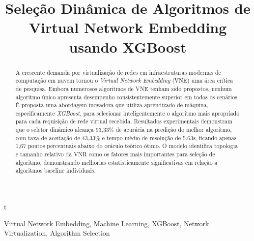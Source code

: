 \documentclass[conference]{IEEEtran}
\begin{document}
t
\title{Seleção Dinâmica de Algoritmos de Virtual Network Embedding usando XGBoost}

\author{
\and
{}
}

\maketitle

\begin{abstract}
A crescente demanda por virtualização de redes em infraestruturas modernas de computação em nuvem tornou o \textit{Virtual Network Embedding} (VNE) uma área crítica de pesquisa. Embora numerosos algoritmos de VNE tenham sido propostos, nenhum algoritmo único apresenta desempenho consistentemente superior em todos os cenários. É proposta uma abordagem inovadora que utiliza aprendizado de máquina, especificamente \textit{XGBoost}, para selecionar inteligentemente o algoritmo mais apropriado para cada requisição de rede virtual recebida. Resultados experimentais demonstram que o seletor dinâmico alcança 93,33\% de acurácia na predição do melhor algoritmo, com taxa de aceitação de 43,33\% e tempo médio de resolução de 5,63s, ficando apenas 1,67 pontos percentuais abaixo do oráculo teórico ótimo. O modelo identifica topologia e tamanho relativo da VNR como os fatores mais importantes para seleção de algoritmo, demonstrando melhorias estatisticamente significativas em relação a algoritmos baseline individuais.
\end{abstract}

\begin{IEEEkeywords}
Virtual Network Embedding, Machine Learning, XGBoost, Network Virtualization, Algorithm Selection
\end{IEEEkeywords}

\end{document}
